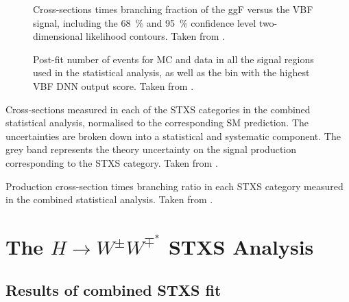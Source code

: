 \begin{figure}
    \caption{Cross-sections times branching fraction of the ggF versus the VBF signal, including the \SI{68}{\percent} and \SI{95}{\percent} confidence level two-dimensional likelihood contours. Taken from .}
    \label{fig:avocado-plot}
\end{figure}

\begin{figure}
    \caption{Post-fit number of events for MC and data in all the signal regions used in the statistical analysis, as well as the bin with the highest VBF DNN output score. Taken from .}
    \label{fig:post-fit-yields}
\end{figure}



\begin{table}
    \caption{Cross-sections measured in each of the STXS categories in the combined statistical analysis, normalised to the corresponding SM prediction. The uncertainties are broken down into a statistical and systematic component. The grey band represents the theory uncertainty on the signal production corresponding to the STXS category. Taken from .}
    \label{fig:stxs-pois-bar-plot}
\end{table}

\begin{table}
    \caption{Production cross-section times \HWW branching ratio in each STXS category measured in the combined statistical analysis. Taken from .}
    \label{fig:stxs-xsec-uncertainties}
\end{table}


\section{The $H\rightarrow W^{\pm}W^{\mp^*}$ STXS Analysis}
\subsection{Results of combined STXS fit}
